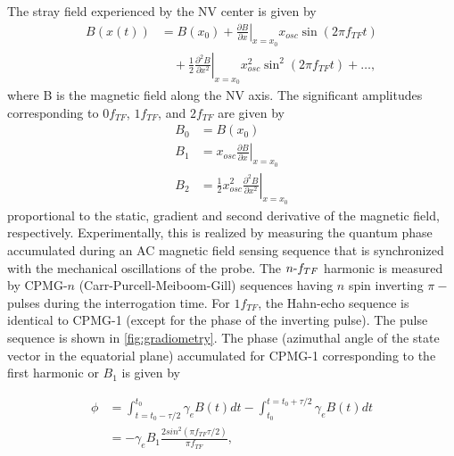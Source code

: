 The stray field experienced by the \gls{NV} center is given by
\begin{equation}
    \begin{split}
        B(x(t)) &= B(x_0) + \left. \frac{\partial B}{\partial x} \right\rvert_{x=x_0} x_{osc} \sin(2\pi f_{TF}t) \\
        &\quad + \frac{1}{2} \left. \frac{\partial^2 B}{\partial x^2} \right\rvert_{x=x_0} x^2_{osc} \sin^2(2\pi f_{TF}t) + \ldots,
    \end{split}
\end{equation}
where B is the magnetic field along the \gls{NV} axis.
The significant amplitudes corresponding to $0f_{TF}$, $1f_{TF}$, and $2f_{TF}$ are given by
\begin{equation}
    \begin{split}
        B_0 &= B(x_0) \\
        B_1 &= x_{osc} \left. \frac{\partial B}{\partial x} \right\rvert_{x=x_0} \\
        B_2 &= \frac{1}{2} x^2_{osc} \left. \frac{\partial^2 B}{\partial x^2} \right\rvert_{x=x_0} 
    \end{split}
\end{equation}
proportional to the static, gradient and second derivative of the magnetic field, respectively\cite{huxterScanningGradiometrySingle2022}.
Experimentally, this is realized by measuring the quantum phase accumulated during an AC magnetic field sensing sequence that is synchronized with the mechanical oscillations of the probe. The $n\text-f_{TF}$ harmonic is measured by \gls{CPMG}-$n$ (Carr-Purcell-Meiboom-Gill) sequences having $n$ spin inverting $\pi-$pulses during the interrogation time\cite{degenQuantumSensing2017}. For $1f_{TF}$, the Hahn-echo sequence is identical to \gls{CPMG}-1 (except for the phase of the inverting pulse). The pulse sequence is shown in \cref{fig:gradiometry}. The phase (azimuthal angle of the state vector in the equatorial plane) accumulated for \gls{CPMG}-1 corresponding to the first harmonic or $B_1$ is given by

\begin{equation}
    \begin{split}
        \phi &= \int_{t=t_0-\tau/2}^{t_0} \gamma_e B(t)dt - \int_{t_0}^{t=t_0+\tau/2} \gamma_e B(t)dt \\
            &= -\gamma_e B_1 \frac{2 sin^2(\pi f_{TF} \tau/2 )}{\pi f_{TF}},
    \end{split}
\end{equation}

